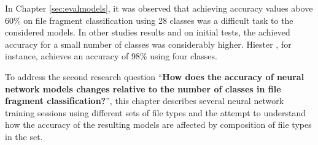 In Chapter \ref{sec:evalmodels}, it was observed that achieving accuracy values above 60\% on file fragment classification using 28 classes was a difficult task to the considered models. In other studies results \cite{hiester_file_2018} \cite{sportiello_context-based_2012} \cite{amirani_feature-based_2013} \cite{maslim_distributed_2014} and on initial tests, the achieved accuracy for a small number of classes was considerably higher. Hiester \cite{hiester_file_2018}, for instance, achieves an accuracy of 98\% using four classes.


To address the second research question 
``\textbf{How does the accuracy of neural network models changes relative to the number of classes in file fragment classification?}'', 
this chapter describes several neural network training sessions using different sets of file types and the attempt to understand how the accuracy of the resulting models are affected by composition of file types in the set.
